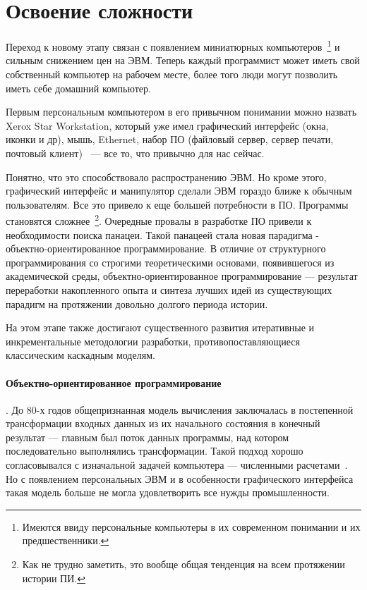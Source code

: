 \section{Освоение сложности}

Переход к новому этапу связан с появлением миниатюрных компьютеров~\footnote{Имеются ввиду персональные компьютеры в их современном понимании и их предшественники.} и сильным снижением цен на ЭВМ. Теперь каждый программист может иметь свой собственный компьютер на рабочем месте, более того люди могут позволить иметь себе домашний компьютер.

Первым персональным компьютером в его привычном понимании можно назвать Xerox Star Workstation, который уже имел графический интерфейс (окна, иконки и др), мышь, Ethernet, набор ПО (файловый сервер, сервер печати, почтовый клиент)~\cite{PCHIST} — все то, что привычно для нас сейчас.

Понятно, что это способствовало распространению ЭВМ. Но кроме этого, графический интерфейс и манипулятор сделали ЭВМ гораздо ближе к обычным пользователям. Все это привело к еще большей потребности в ПО. Программы становятся сложнее~\footnote{Как не трудно заметить, это вообще общая тенденция на всем протяжении истории ПИ.}. Очередные провалы в разработке ПО привели к необходимости поиска панацеи. Такой панацеей стала новая парадигма - объектно-ориентированное программирование. В отличие от структурного программирования со строгими теоретическими основами, появившегося из академической среды, объектно-ориентированное программирование — результат переработки накопленного опыта и синтеза лучших идей из существующих парадигм на протяжении довольно долгого периода истории.

На этом этапе также достигают существенного развития итеративные и инкрементальные методологии разработки, противопоставляющиеся классическим каскадным моделям.

\paragraph{Объектно-ориентированное программирование}. До 80-х годов общепризнанная модель вычисления заключалась в постепенной трансформации входных данных из их начального состояния в конечный результат — главным был поток данных программы, над котором последовательно выполнялись трансформации. Такой подход хорошо согласовывался с изначальной задачей компьютера — численными расчетами~\cite{Wirth:2008:HIST}. Но с появлением персональных ЭВМ и в особенности графического интерфейса такая модель больше не могла удовлетворить все нужды промышленности.

